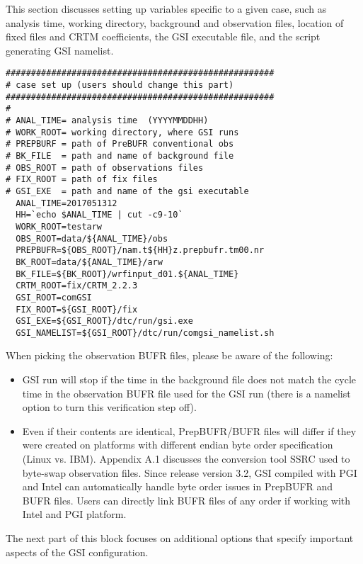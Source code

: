 
This section discusses setting up variables specific to a given case, such as analysis time, working directory, background and observation files, location of fixed files and CRTM coefficients, the GSI executable file, and the script generating GSI namelist. 

\begin{footnotesize}
\begin{verbatim}
#####################################################
# case set up (users should change this part)
#####################################################
#
# ANAL_TIME= analysis time  (YYYYMMDDHH)
# WORK_ROOT= working directory, where GSI runs
# PREPBURF = path of PreBUFR conventional obs
# BK_FILE  = path and name of background file
# OBS_ROOT = path of observations files
# FIX_ROOT = path of fix files
# GSI_EXE  = path and name of the gsi executable
  ANAL_TIME=2017051312
  HH=`echo $ANAL_TIME | cut -c9-10`
  WORK_ROOT=testarw
  OBS_ROOT=data/${ANAL_TIME}/obs
  PREPBUFR=${OBS_ROOT}/nam.t${HH}z.prepbufr.tm00.nr
  BK_ROOT=data/${ANAL_TIME}/arw
  BK_FILE=${BK_ROOT}/wrfinput_d01.${ANAL_TIME}
  CRTM_ROOT=fix/CRTM_2.2.3
  GSI_ROOT=comGSI
  FIX_ROOT=${GSI_ROOT}/fix
  GSI_EXE=${GSI_ROOT}/dtc/run/gsi.exe
  GSI_NAMELIST=${GSI_ROOT}/dtc/run/comgsi_namelist.sh
\end{verbatim}
\end{footnotesize}

When picking the observation BUFR files, please be aware of the following: 

\begin{itemize}
\item GSI run will stop if the time in the background file does not match the cycle time in the observation BUFR file used for the GSI run (there is a namelist option to turn this verification step off).
\item Even if their contents are identical, PrepBUFR/BUFR files will differ if they were created on platforms with different endian byte order specification (Linux vs. IBM). Appendix A.1 discusses the conversion tool SSRC used to byte-swap observation files. Since release version 3.2, GSI compiled with PGI and Intel can automatically handle byte order issues in PrepBUFR and BUFR files. Users can directly link BUFR files of any order if working with Intel and PGI platform.
\end{itemize}

The next part of this block focuses on additional options that specify important aspects of the GSI configuration. 

